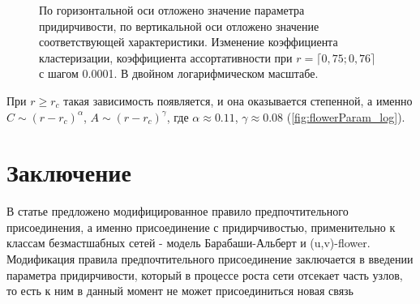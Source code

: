 \documentclass[10pt,aps,pra]{revtex4-1}
\begin{document}
            \begin{figure}[H]  
                \centering

                \caption{
                    \label{fig:flowerParam}
                    По горизонтальной оси отложено значение параметра придирчивости, по вертикальной оси отложено значение соответствующей характеристики.
                     Изменение коэффициента кластеризации, коэффициента ассортативности при $r=\lceil 0,75; 0,76 \rceil$ с шагом 0.0001. В двойном логарифмическом масштабе.
                }
            \end{figure}

        При $r \geq r_c$ такая зависимость появляется, и она оказывается степенной, а именно $C \sim {(r-r_c)}^\alpha$, $A \sim {(r-r_c)}^\gamma$, где $\alpha \approx 0.11$, $\gamma \approx 0.08$ (\ref{fig:flowerParam_log}).

\section{Заключение}

    В статье предложено модифицированное правило предпочтительного присоединения, а именно присоединение с придирчивостью, применительно к классам безмастшабных сетей - модель Барабаши-Альберт и (u,v)-flower. Модификация правила предпочтительного присоединение заключается в введении параметра придирчивости, который в процессе роста сети отсекает часть узлов,  то есть к ним в данный момент не может присоединиться новая связь
\end{document}
